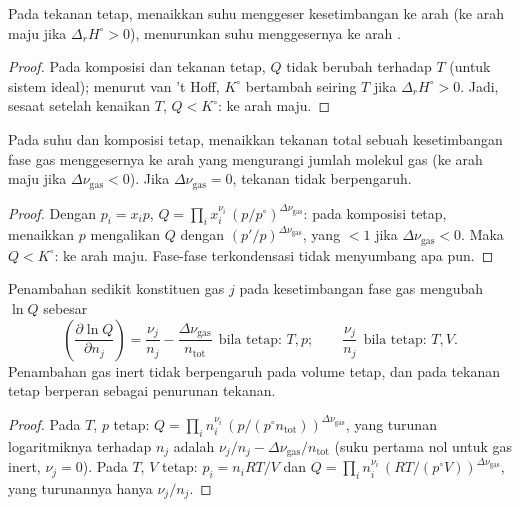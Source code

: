 \begin{proposition}[Suhu]\label{prop:b2:equilibrium-shifts:temperature}
Pada tekanan tetap, menaikkan suhu menggeser kesetimbangan ke arah
 (ke arah maju jika $\Delta_r H^\circ > 0$), menurunkan suhu
menggesernya ke arah .
\end{proposition}

\begin{proof}
Pada komposisi dan tekanan tetap, $Q$ tidak berubah terhadap $T$ (untuk
sistem ideal); menurut van 't Hoff, $K^\circ$ bertambah seiring $T$ jika
$\Delta_r H^\circ >
0$. Jadi, sesaat setelah kenaikan $T$, $Q < K^\circ$:
ke arah maju.
\end{proof}

\begin{proposition}[Tekanan]\label{prop:b2:equilibrium-shifts:pressure}
Pada suhu dan komposisi tetap, menaikkan tekanan total sebuah
kesetimbangan fase gas menggesernya ke arah yang mengurangi jumlah molekul
gas (ke arah maju jika $\Delta\nu_{\text{gas}} < 0$). Jika
$\Delta\nu_{\text{gas}}
= 0$, tekanan tidak berpengaruh.
\end{proposition}

\begin{proof}
Dengan $p_i = x_ip$, $Q = \prod_i x_i^{\nu_i}\,(p/p^\circ)^{\Delta\nu_{\text{gas}}}$:
pada komposisi tetap, menaikkan $p$ mengalikan $Q$ dengan
$(p'/p)^{\Delta\nu_{\text{gas}}}$, yang $< 1$ jika
$\Delta\nu_{\text{gas}} <
0$. Maka $Q < K^\circ$: ke arah maju. Fase-fase
terkondensasi tidak menyumbang apa pun.
\end{proof}

\begin{proposition}\label{prop:b2:equilibrium-shifts:adding}
Penambahan sedikit konstituen gas $j$ pada kesetimbangan fase gas
mengubah $\ln Q$ sebesar
\[
  \left(\frac{\partial\ln Q}{\partial n_j}\right) = \frac{\nu_j}{n_j} -
  \frac{\Delta\nu_{\text{gas}}}{n_{\text{tot}}}\ \ \text{bila tetap: } T, p ;
  \qquad \frac{\nu_j}{n_j}\ \ \text{bila tetap: } T, V .
\]
Penambahan gas inert tidak berpengaruh pada volume tetap, dan pada
tekanan tetap berperan sebagai penurunan tekanan.
\end{proposition}

\begin{proof}
Pada $T$, $p$ tetap: $Q = \prod_i n_i^{\nu_i}\,(p/(p^\circ n_{\text{tot}}))^{
\Delta\nu_{\text{gas}}}$, yang turunan logaritmiknya terhadap $n_j$ adalah
$\nu_j/n_j - \Delta\nu_{\text{gas}}/n_{\text{tot}}$ (suku pertama nol
untuk gas inert, $\nu_j = 0$). Pada $T$, $V$ tetap: $p_i = n_iRT/V$ dan
$Q = \prod_i n_i^{
\nu_i}\,(RT/(p^\circ V))^{\Delta\nu_{\text{gas}}}$, yang
turunannya hanya $\nu_j/n_j$.
\end{proof}

